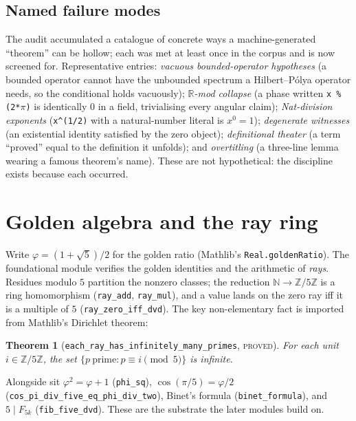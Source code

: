 \documentclass[11pt]{article}
\newtheorem{theorem}{Theorem}[section]
\theoremstyle{definition}
\theoremstyle{remark}
\newcommand{\phigr}{\varphi}
\newcommand{\lean}[1]{\texttt{#1}}
\begin{document}
\subsection{Named failure modes}
The audit accumulated a catalogue of concrete ways a machine-generated ``theorem'' can be
hollow; each was met at least once in the corpus and is now screened for. Representative
entries: \emph{vacuous bounded-operator hypotheses} (a bounded operator cannot have the
unbounded spectrum a Hilbert--P\'olya operator needs, so the conditional holds vacuously);
\emph{$\mathbb{R}$-mod collapse} (a phase written \texttt{x \% (2*$\pi$)} is identically $0$ in
a field, trivialising every angular claim); \emph{Nat-division exponents} (\texttt{x\^{}(1/2)}
with a natural-number literal is $x^0=1$); \emph{degenerate witnesses} (an existential identity
satisfied by the zero object); \emph{definitional theater} (a term ``proved'' equal to the
definition it unfolds); and \emph{overtitling} (a three-line lemma wearing a famous theorem's
name). These are not hypothetical: the discipline exists because each occurred.

\section{Golden algebra and the ray ring}\label{sec:core}

Write $\phigr=(1+\sqrt5)/2$ for the golden ratio (Mathlib's \lean{Real.goldenRatio}). The
foundational module verifies the golden identities and the arithmetic of \emph{rays}. Residues
modulo $5$ partition the nonzero classes; the reduction $\mathbb{N}\to\mathbb{Z}/5\mathbb{Z}$ is
a ring homomorphism (\lean{ray\_add}, \lean{ray\_mul}), and a value lands on the zero ray iff it
is a multiple of $5$ (\lean{ray\_zero\_iff\_dvd}). The key non-elementary fact is imported from
Mathlib's Dirichlet theorem:

\begin{theorem}[\lean{each\_ray\_has\_infinitely\_many\_primes}, \textsc{proved}]\label{thm:dirichlet}
For each unit $i\in\mathbb{Z}/5\mathbb{Z}$, the set $\{p\ \text{prime}:p\equiv i \pmod 5\}$ is
infinite.
\end{theorem}

\noindent Alongside sit $\phigr^2=\phigr+1$ (\lean{phi\_sq}), $\cos(\pi/5)=\phigr/2$
(\lean{cos\_pi\_div\_five\_eq\_phi\_div\_two}), Binet's formula (\lean{binet\_formula}), and
$5\mid F_{5k}$ (\lean{fib\_five\_dvd}). These are the substrate the later modules build on.
\end{document}
